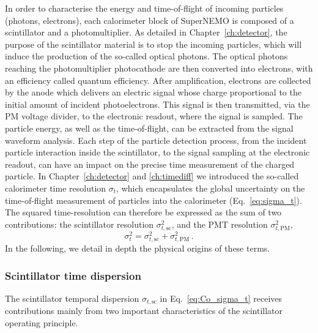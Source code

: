 In order to characterise the energy and time-of-flight of incoming particles (photons, electrons), each calorimeter block of SuperNEMO is composed of a scintillator and a photomultiplier.
As detailed in Chapter~\ref{ch:detector}, the purpose of the scintillator material is to stop the incoming particles, which will induce the production of the so-called optical photons.
The optical photons reaching the photomultiplier photocathode are then converted into electrons, with an efficiency called quantum efficiency.
After amplification, electrons are collected by the anode which delivers an electric signal whose charge proportional to the initial amount of incident photoelectrons.
This signal is then transmitted, via the PM voltage divider, to the electronic readout, where the signal is sampled.
The particle energy, as well as the time-of-flight, can be extracted from the signal waveform analysis.
Each step of the particle detection process, from the incident particle interaction inside the scintillator, to the signal sampling at the electronic readout, can have an impact on the precise time measurement of the charged particle.
In Chapter~\ref{ch:detector} and \ref{ch:timediff} we introduced the so-called calorimeter time resolution $\sigma_t$, which encapsulates the global uncertainty on the time-of-flight measurement of particles into the calorimeter (Eq.~\eqref{eq:sigma_t}).
The squared time-resolution can therefore be expressed as the sum of two contributions:
the scintillator resolution $\sigma_{t, \textrm{sc}}^{2}$, and the PMT resolution $\sigma_{t, \textrm{PM}}^{2}$,
\begin{equation}
  \sigma_{t}^{2}=\sigma_{t,\text{sc}}^{2}+\sigma_{t,\text{PM}}^{2}\,.
  \label{eq:Co_sigma_t}
\end{equation}
In the following, we detail in depth the physical origins of these terms.

\subsubsection*{Scintillator time dispersion}
The scintillator temporal dispersion $\sigma_{t,\text{sc}}$ in Eq.~\eqref{eq:Co_sigma_t} receives contributions mainly from two important characteristics of the scintillator operating principle.

